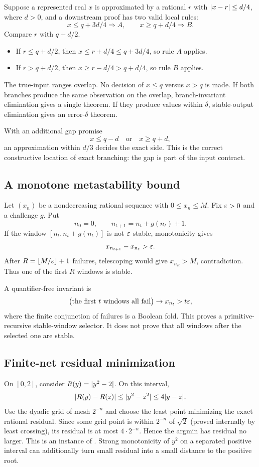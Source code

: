 Suppose a represented real $x$ is approximated by a rational $r$ with
$\lvert x-r\rvert\le d/4$, where $d>0$, and a downstream proof has two valid local rules:
\[
  x\le q+3d/4\Rightarrow A,
  \qquad
  x\ge q+d/4\Rightarrow B.
\]
Compare $r$ with $q+d/2$.

\begin{itemize}
\item If $r\le q+d/2$, then $x\le r+d/4\le q+3d/4$, so rule $A$ applies.
\item If $r>q+d/2$, then $x\ge r-d/4>q+d/4$, so rule $B$ applies.
\end{itemize}

The true-input ranges overlap.  No decision of $x\le q$ versus $x>q$ is made.  If both branches produce the same observation on the overlap, branch-invariant elimination gives a single theorem.  If they produce values within $\delta$, stable-output elimination gives an error-$\delta$ theorem.

With an additional gap promise
\[
  x\le q-d\quad\text{or}\quad x\ge q+d,
\]
an approximation within $d/3$ decides the exact side.  This is the correct constructive location of exact branching: the gap is part of the input contract.

\subsection{A monotone metastability bound}

Let $(x_n)$ be a nondecreasing rational sequence with $0\le x_n\le M$.  Fix $\varepsilon>0$ and a challenge $g$.  Put
\[
 n_0=0,\qquad n_{t+1}=n_t+g(n_t)+1.
\]
If the window $[n_t,n_t+g(n_t)]$ is not $\varepsilon$-stable, monotonicity gives
\[
 x_{n_{t+1}}-x_{n_t}>\varepsilon.
\]
After $R=\lfloor M/\varepsilon\rfloor+1$ failures, telescoping would give
$x_{n_R}>M$, contradiction.  Thus one of the first $R$ windows is stable.

A quantifier-free invariant is
\[
 \bigl(\text{the first $t$ windows all fail}\bigr)
 \to x_{n_t}>t\varepsilon,
\]
where the finite conjunction of failures is a Boolean fold.  This proves a primitive-recursive stable-window selector.  It does not prove that all windows after the selected one are stable.

\subsection{Finite-net residual minimization}

On $[0,2]$, consider $R(y)=\lvert y^2-2\rvert$.  On this interval,
\[
 \lvert R(y)-R(z)\rvert\le\lvert y^2-z^2\rvert
 \le4\lvert y-z\rvert.
\]
Use the dyadic grid of mesh $2^{-n}$ and choose the least point minimizing the exact rational residual.  Since some grid point is within $2^{-n}$ of $\sqrt2$ (proved internally by least crossing), its residual is at most $4\cdot2^{-n}$.  Hence the argmin has residual no larger.  This is an instance of .  Strong monotonicity of $y^2$ on a separated positive interval can additionally turn small residual into a small distance to the positive root.

